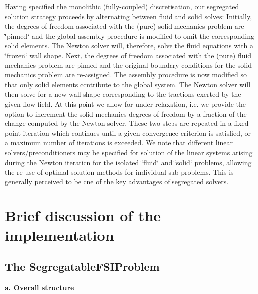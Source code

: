 Having specified the monolithic (fully-\/coupled) discretisation, our segregated solution strategy proceeds by alternating between fluid and solid solves\+: Initially, the degrees of freedom associated with the (pure) solid mechanics problem are \char`\"{}pinned\char`\"{} and the global assembly procedure is modified to omit the corresponding solid elements. The Newton solver will, therefore, solve the fluid equations with a \char`\"{}frozen\char`\"{} wall shape. Next, the degrees of freedom associated with the (pure) fluid mechanics problem are pinned and the original boundary conditions for the solid mechanics problem are re-\/assigned. The assembly procedure is now modified so that only solid elements contribute to the global system. The Newton solver will then solve for a new wall shape corresponding to the tractions exerted by the given flow field. At this point we allow for under-\/relaxation, i.\+e. we provide the option to increment the solid mechanics degrees of freedom by a fraction of the change computed by the Newton solver. These two steps are repeated in a fixed-\/point iteration which continues until a given convergence criterion is satisfied, or a maximum number of iterations is exceeded. We note that different linear solvers/preconditioners may be specified for solution of the linear systems arising during the Newton iteration for the isolated \char`\"{}fluid\char`\"{} and \char`\"{}solid\char`\"{} problems, allowing the re-\/use of optimal solution methods for individual sub-\/problems. This is generally perceived to be one of the key advantages of segregated solvers.



 

\hypertarget{index_how_its_done}{}\section{Brief discussion of the implementation}\label{index_how_its_done}
\hypertarget{index_seg_problem}{}\subsection{The Segregatable\+F\+S\+I\+Problem}\label{index_seg_problem}
{\bfseries a. Overall structure}

